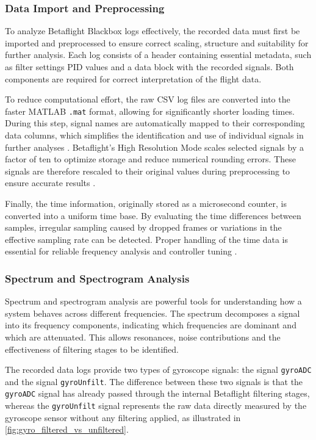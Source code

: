 \documentclass[a4paper,11pt]{scrartcl}
\begin{document}
\clearpage
\subsubsection*{Data Import and Preprocessing}
To analyze Betaflight Blackbox logs effectively, the recorded data must first be imported and preprocessed to ensure correct scaling, structure and suitability for further analysis. Each log consists of a header containing essential metadata, such as filter settings PID values and a data block with the recorded signals. Both components are required for correct interpretation of the flight data.

To reduce computational effort, the raw CSV log files are converted into the faster MATLAB \texttt{.mat} format, allowing for significantly shorter loading times. During this step, signal names are automatically mapped to their corresponding data columns, which simplifies the identification and use of individual signals in further analyses \parencite{bf_LoadData}. Betaflight's High Resolution Mode scales selected signals by a factor of ten to optimize storage and reduce numerical rounding errors. These signals are therefore rescaled to their original values during preprocessing to ensure accurate results \parencite{bf_UnshigRes}.

Finally, the time information, originally stored as a microsecond counter, is converted into a uniform time base. By evaluating the time differences between samples, irregular sampling caused by dropped frames or variations in the effective sampling rate can be detected. Proper handling of the time data is essential for reliable frequency analysis and controller tuning \parencite{bf_TimeConv}.

\subsubsection*{Spectrum and Spectrogram Analysis}

Spectrum and spectrogram analysis are powerful tools for understanding how a system behaves across different frequencies. The spectrum decomposes a signal into its frequency components, indicating which frequencies are dominant and which are attenuated. This allows resonances, noise contributions and the effectiveness of filtering stages to be identified.

The recorded data logs provide two types of gyroscope signals: the signal \texttt{gyroADC} and the signal \texttt{gyroUnfilt}. The difference between these two signals is that the \texttt{gyroADC} signal has already passed through the internal Betaflight filtering stages, whereas the \texttt{gyroUnfilt} signal represents the raw data directly measured by the gyroscope sensor without any filtering applied, as illustrated in \autoref{fig:gyro_filtered_vs_unfiltered}.
\end{document}
